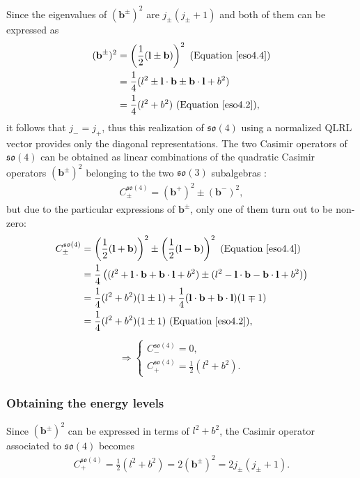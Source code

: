 \documentclass[12pt,a4paper]{report}
\theoremstyle{definition}
\theoremstyle{remark}
\theoremstyle{remark}
\begin{document}
Since the eigenvalues of $(\textbf{b}^\pm)^2$ are $j_\pm(j_\pm+1)$ and both of them can be expressed as
\begin{align*}
(\textbf{b}^\pm)^2 &= \left(\frac{1}{2}(\textbf{l}\pm\textbf{b})\right)^2 \text{ (Equation~\ref{eso4.4})}\\
&= \frac{1}{4}(l^2\pm\textbf{l}\cdot\textbf{b}\pm\textbf{b}\cdot\textbf{l}+b^2) \\
&= \frac{1}{4}(l^2+b^2) \text{ (Equation~\ref{eso4.2})},
\end{align*}
it follows that $j_-=j_+$, thus this realization of $\mathfrak{so}(4)$ using a normalized QLRL vector provides only the diagonal representations. 
The two Casimir operators of $\mathfrak{so}(4)$ can be obtained as linear combinations of the quadratic Casimir operators $\left(\textbf{b}^{\pm}\right)^2$ belonging to the two $\mathfrak{so}(3)$ subalgebras \cite{wybourne}:
\begin{align*} 
C_{\pm}^{\mathfrak{so}(4)}=\left(\textbf{b}^+\right)^2 \pm \left(\textbf{b}^-\right)^2,
\end{align*}
but due to the particular expressions of $\textbf{b}^{\pm}$, only one of them turn out to be non-zero:
\begin{align*}
C_{\pm}^{\mathfrak{so}(4)}&=\left(\frac{1}{2}(\textbf{l}+\textbf{b})\right)^2 \pm \left(\frac{1}{2}(\textbf{l}-\textbf{b})\right)^2 \text{ (Equation~\ref{eso4.4})} \\
&= \frac{1}{4}\left((l^2+\textbf{l}\cdot\textbf{b}+\textbf{b}\cdot\textbf{l}+b^2)\pm(l^2-\textbf{l}\cdot\textbf{b}-\textbf{b}\cdot\textbf{l}+b^2)\right) \\
&= \frac{1}{4}(l^2+b^2)(1\pm 1)+\frac{1}{4}(\textbf{l}\cdot\textbf{b}+\textbf{b}\cdot\textbf{l})(1\mp 1) \\
&= \frac{1}{4}(l^2+b^2)(1\pm 1) \text{ (Equation~\ref{eso4.2})}, 
\end{align*}
\begin{align*}
\Rightarrow \begin{cases} C_{-}^{\mathfrak{so}(4)}=0, \\ C_{+}^{\mathfrak{so}(4)}=\frac{1}{2}(l^2+b^2).\end{cases}
\end{align*}

\subsubsection{Obtaining the energy levels}
Since $(\textbf{b}^\pm)^2$ can be expressed in terms of $l^2+b^2$, the Casimir operator associated to $\mathfrak{so}(4)$ becomes
\begin{align*}
C^{\mathfrak{so}(4)}_+=\frac{1}{2}(l^2+b^2) = 2(\textbf{b}^\pm)^2 = 2j_\pm(j_\pm+1).
\end{align*}
\end{document}
